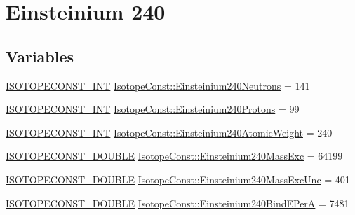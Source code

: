 \hypertarget{group___isotope_const-_einsteinium-_es240}{}\section{Einsteinium 240}
\label{group___isotope_const-_einsteinium-_es240}
\subsection*{Variables}
\begin{DoxyCompactItemize}
\item 
\mbox{\hyperlink{group___isotope_const-_macros_ga5f18360b3e99483a35c32d789e62621c}{I\+S\+O\+T\+O\+P\+E\+C\+O\+N\+S\+T\+\_\+\+I\+NT}} \mbox{\hyperlink{group___isotope_const-_einsteinium-_es240_ga3ecd889943a28c6035975a6775426b42}{Isotope\+Const\+::\+Einsteinium240\+Neutrons}} = 141
\item 
\mbox{\hyperlink{group___isotope_const-_macros_ga5f18360b3e99483a35c32d789e62621c}{I\+S\+O\+T\+O\+P\+E\+C\+O\+N\+S\+T\+\_\+\+I\+NT}} \mbox{\hyperlink{group___isotope_const-_einsteinium-_es240_ga73a4fc0e6036be33ffa2ff0b5e6e7d86}{Isotope\+Const\+::\+Einsteinium240\+Protons}} = 99
\item 
\mbox{\hyperlink{group___isotope_const-_macros_ga5f18360b3e99483a35c32d789e62621c}{I\+S\+O\+T\+O\+P\+E\+C\+O\+N\+S\+T\+\_\+\+I\+NT}} \mbox{\hyperlink{group___isotope_const-_einsteinium-_es240_ga99563ebd8cc8f0e5631b0facb4a97aea}{Isotope\+Const\+::\+Einsteinium240\+Atomic\+Weight}} = 240
\item 
\mbox{\hyperlink{group___isotope_const-_macros_ga8f45a7272ce02c0b4c65c44636ed719a}{I\+S\+O\+T\+O\+P\+E\+C\+O\+N\+S\+T\+\_\+\+D\+O\+U\+B\+LE}} \mbox{\hyperlink{group___isotope_const-_einsteinium-_es240_gaaaa799184d54b133d6328d9eb0a904ef}{Isotope\+Const\+::\+Einsteinium240\+Mass\+Exc}} = 64199
\item 
\mbox{\hyperlink{group___isotope_const-_macros_ga8f45a7272ce02c0b4c65c44636ed719a}{I\+S\+O\+T\+O\+P\+E\+C\+O\+N\+S\+T\+\_\+\+D\+O\+U\+B\+LE}} \mbox{\hyperlink{group___isotope_const-_einsteinium-_es240_ga5484f2feda6e4f476a6daf8b5670b678}{Isotope\+Const\+::\+Einsteinium240\+Mass\+Exc\+Unc}} = 401
\item 
\mbox{\hyperlink{group___isotope_const-_macros_ga8f45a7272ce02c0b4c65c44636ed719a}{I\+S\+O\+T\+O\+P\+E\+C\+O\+N\+S\+T\+\_\+\+D\+O\+U\+B\+LE}} \mbox{\hyperlink{group___isotope_const-_einsteinium-_es240_ga2298b5a88b4d03d93f4b3001b589309e}{Isotope\+Const\+::\+Einsteinium240\+Bind\+E\+PerA}} = 7481
\item 

\end{DoxyCompactItemize}
